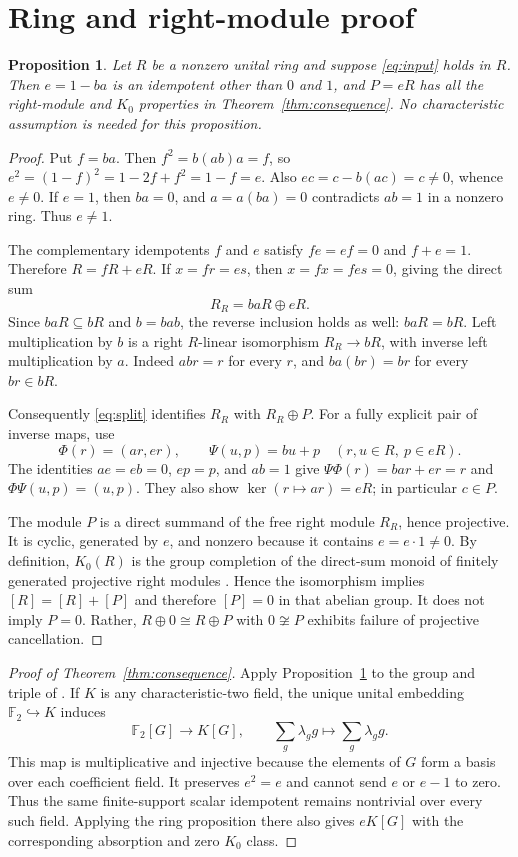 \documentclass[11pt]{article}
\newtheorem{proposition}[theorem]{Proposition}
\newcommand{\Ftwo}{\mathbb F_2}
\begin{document}
\section{Ring and right-module proof}
\begin{proposition}\label{prop:ring}
Let $R$ be a nonzero unital ring and suppose \eqref{eq:input} holds in $R$.
Then $e=1-ba$ is an idempotent other than $0$ and $1$, and $P=eR$ has all
the right-module and $K_0$ properties in Theorem~\ref{thm:consequence}.
No characteristic assumption is needed for this proposition.
\end{proposition}
\begin{proof}
Put $f=ba$. Then $f^2=b(ab)a=f$, so
$e^2=(1-f)^2=1-2f+f^2=1-f=e$.
Also $ec=c-b(ac)=c\ne0$, whence $e\ne0$.
If $e=1$, then $ba=0$, and $a=a(ba)=0$ contradicts $ab=1$ in a
nonzero ring. Thus $e\ne1$.

The complementary idempotents $f$ and $e$ satisfy $fe=ef=0$ and
$f+e=1$. Therefore $R=fR+eR$. If $x=fr=es$, then
$x=fx=fes=0$, giving the direct sum
\begin{equation}\label{eq:split}
R_R=baR\oplus eR.
\end{equation}
Since $baR\subseteq bR$ and $b=bab$, the reverse inclusion holds as
well: $baR=bR$. Left multiplication by $b$ is a right $R$-linear
isomorphism $R_R\to bR$, with inverse left multiplication by $a$.
Indeed $abr=r$ for every $r$, and $ba(br)=br$ for every $br\in bR$.

Consequently \eqref{eq:split} identifies $R_R$ with $R_R\oplus P$.
For a fully explicit pair of inverse maps, use
\[
\Phi(r)=(ar,er),\qquad \Psi(u,p)=bu+p
\quad (r,u\in R,\ p\in eR).
\]
The identities $ae=eb=0$, $ep=p$, and $ab=1$ give
$\Psi\Phi(r)=bar+er=r$ and $\Phi\Psi(u,p)=(u,p)$.
They also show $\ker(r\mapsto ar)=eR$; in particular $c\in P$.

The module $P$ is a direct summand of the free right module $R_R$, hence
projective. It is cyclic, generated by $e$, and nonzero because it
contains $e=e\cdot1\ne0$. By definition, $K_0(R)$ is the group completion
of the direct-sum monoid of finitely generated projective right modules
\cite[Chapter II, Section 2]{Weibel}. Hence the isomorphism implies
$[R]=[R]+[P]$ and therefore $[P]=0$ in that abelian group.
It does not imply $P=0$. Rather, $R\oplus0\cong R\oplus P$ with
$0\not\cong P$ exhibits failure of projective cancellation.
\end{proof}

\begin{proof}[Proof of Theorem~\ref{thm:consequence}]
Apply Proposition~\ref{prop:ring} to the group and triple of
\cite[Theorem 1.1]{OpenAI}. If $K$ is any characteristic-two field, the
unique unital embedding $\Ftwo\hookrightarrow K$ induces
\[
\Ftwo[G]\longrightarrow K[G],\qquad
\sum_g\lambda_g g\longmapsto\sum_g\lambda_g g.
\]
This map is multiplicative and injective because the elements of $G$
form a basis over each coefficient field. It preserves $e^2=e$ and
cannot send $e$ or $e-1$ to zero. Thus the same finite-support scalar
idempotent remains nontrivial over every such field. Applying the ring
proposition there also gives $eK[G]$ with the corresponding absorption
and zero $K_0$ class.
\end{proof}
\end{document}
